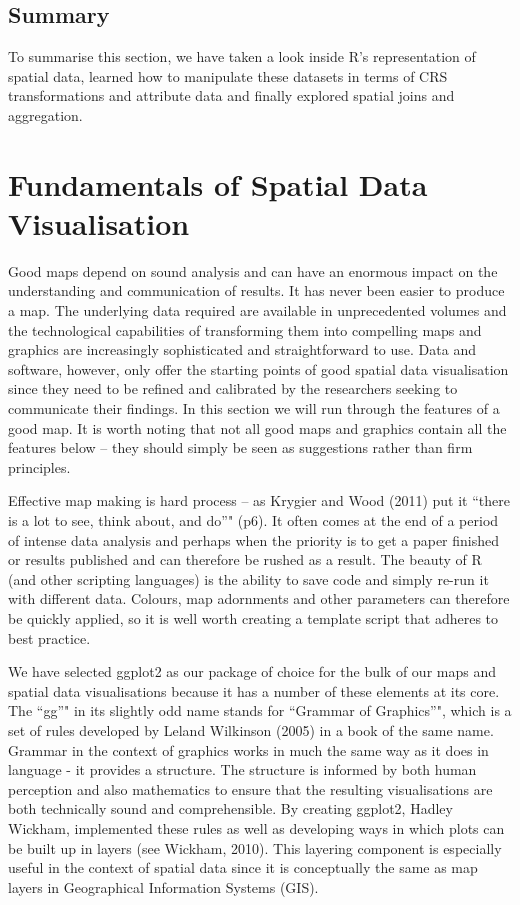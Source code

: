 \documentclass[]{article}
\begin{document}
\subsection{Summary}

To summarise this section, we have taken a look inside R's
representation of spatial data, learned how to manipulate these datasets
in terms of CRS transformations and attribute data and finally explored
spatial joins and aggregation.

\section{Fundamentals of Spatial Data Visualisation}

Good maps depend on sound analysis and can have an enormous impact on
the understanding and communication of results. It has never been easier
to produce a map. The underlying data required are available in
unprecedented volumes and the technological capabilities of transforming
them into compelling maps and graphics are increasingly sophisticated
and straightforward to use. Data and software, however, only offer the
starting points of good spatial data visualisation since they need to be
refined and calibrated by the researchers seeking to communicate their
findings. In this section we will run through the features of a good
map. It is worth noting that not all good maps and graphics contain all
the features below -- they should simply be seen as suggestions rather
than firm principles.

Effective map making is hard process -- as Krygier and Wood (2011) put
it ``there is a lot to see, think about, and do''" (p6). It often comes
at the end of a period of intense data analysis and perhaps when the
priority is to get a paper finished or results published and can
therefore be rushed as a result. The beauty of R (and other scripting
languages) is the ability to save code and simply re-run it with
different data. Colours, map adornments and other parameters can
therefore be quickly applied, so it is well worth creating a template
script that adheres to best practice.

We have selected ggplot2 as our package of choice for the bulk of our
maps and spatial data visualisations because it has a number of these
elements at its core. The ``gg''" in its slightly odd name stands for
``Grammar of Graphics''", which is a set of rules developed by Leland
Wilkinson (2005) in a book of the same name. Grammar in the context of
graphics works in much the same way as it does in language - it provides
a structure. The structure is informed by both human perception and also
mathematics to ensure that the resulting visualisations are both
technically sound and comprehensible. By creating ggplot2, Hadley
Wickham, implemented these rules as well as developing ways in which
plots can be built up in layers (see Wickham, 2010). This layering
component is especially useful in the context of spatial data since it
is conceptually the same as map layers in Geographical Information
Systems (GIS).
\end{document}
